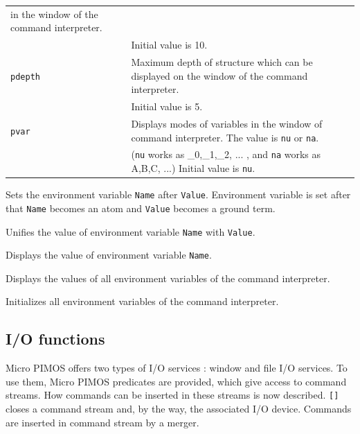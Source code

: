 \begin{center}
\begin{tabular}{|l|l|}
{				 in the window of the command interpreter.}\\
		& {\small Initial value is 10.}\\
\hline
\verb|pdepth| & {\small Maximum depth of structure which can be displayed
		 		on the window of the command interpreter.}\\
		& {\small Initial value is 5.}\\
\hline
\verb|pvar| & {\small Displays modes of variables in the window of 
		command interpreter. The value is \verb|nu| or \verb|na|.}\\
	    & {\small (\verb|nu| works as _0,_1,_2, ... , and \verb|na| 
			works as A,B,C, ...) Initial value is \verb|nu|.}\\
\hline
\end{tabular}
\end{center}
\vspace{1ex}
\begin{itemize}

Sets the environment variable \verb|Name| after \verb|Value|.
Environment variable is set after that \verb|Name| becomes an atom and 
\verb|Value| becomes a ground term.

Unifies the value of environment variable \verb|Name| with \verb|Value|.

Displays the value of environment variable \verb|Name|.

Displays the values of all environment variables of the command interpreter.

Initializes all environment variables of the command interpreter.

\end{itemize}

\subsection{I/O functions}
\label{sec-MPIMOS-IO}  

Micro PIMOS offers two types of I/O services : window and file I/O services.
To use them, Micro PIMOS predicates are provided, which give access to
command streams.
How commands can be inserted in these streams is now described.
\verb|[]| closes a command stream and, by the way, the associated
I/O device. Commands are inserted in command stream by a merger.

